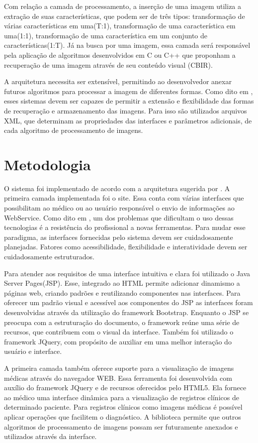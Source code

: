 Com relação a camada de processamento, a inserção de uma imagem utiliza a extração de suas características, que podem ser de três tipos: transformação de várias características em uma(T:1), transformação de uma característica em uma(1:1), transformação de uma característica em um conjunto de características(1:T)\cite{REF10}.
Já na busca por uma imagem, essa camada será responsável pela aplicação de algoritmos desenvolvidos em C ou C++ que proponham a recuperação de uma imagem através de seu conteúdo visual (CBIR).

A arquitetura necessita ser extensível, permitindo ao desenvolvedor anexar futuros algoritmos para processar a imagem de diferentes formas.
Como dito em \cite{REF18}, esses sistemas devem ser capazes de permitir a extensão e flexibilidade das formas de recuperação e armazenamento das imagens.
Para isso são utilizados arquivos XML, que determinam as propriedades das interfaces e parâmetros adicionais, de cada algoritmo de processamento de imagens.

\section{\esp Metodologia}


O sistema foi implementado de acordo com a arquitetura sugerida por \cite{REF10}.
A primeira camada implementada foi o site. Essa conta com várias interfaces que possibilitam ao médico ou ao usuário responsável o envio de informações ao WebService.
Como dito em \cite{REF09}, um dos problemas que dificultam o uso dessas tecnologias é a resistência do profissional a novas ferramentas.
Para mudar esse paradigma, as interfaces fornecidas pelo sistema devem ser cuidadosamente planejadas.
Fatores como acessibilidade, flexibilidade e interatividade devem ser cuidadosamente estruturados.

Para atender aos requisitos de uma interface intuitiva e clara foi utilizado o Java Server Pages(JSP).
Esse, integrado ao HTML permite adicionar dinamismo a páginas web, criando padrões e reutilizando componentes nas interfaces.
Para oferecer um padrão visual e acessível aos componentes do JSP as interfaces foram desenvolvidas através da utilização do framework Bootstrap.
Enquanto o JSP se preocupa com a estruturação do  documento, o framework reúne uma série de recursos, que contribuem com o visual da interface. Também foi utilizado o framework JQuery, com propósito de auxiliar em uma melhor interação do usuário e interface.

A primeira camada também oferece suporte para a visualização de imagens médicas através do navegador WEB. Essa ferramenta foi desenvolvida com auxílio do framework JQuery e de recursos oferecidos pelo HTML5. Ela fornece ao médico uma interface dinâmica para a visualização de registros clínicos de determinado paciente. Para registros clínicos como imagens médicas é possível aplicar operações que facilitem o diagnóstico. A biblioteca permite que outros algoritmos de processamento de imagens possam ser futuramente anexados e utilizados através da interface.

